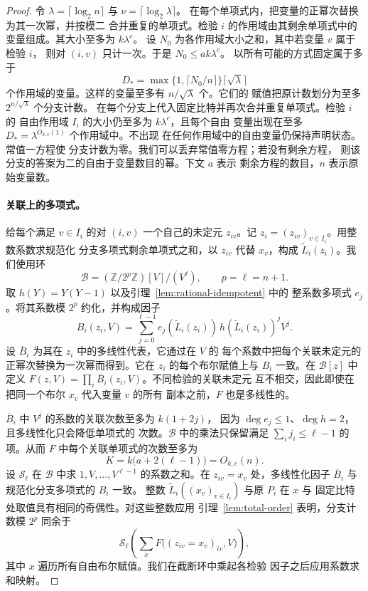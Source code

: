 \begin{proof}
令 $\lambda=\lceil\log_2 n\rceil$ 与
$\nu=\lceil\log_2\lambda\rceil$。
在每个单项式内，把变量的正幂次替换为其一次幂，并按模二
合并重复的单项式。检验 $i$ 的作用域由其剩余单项式中的
变量组成。其大小至多为 $k\lambda^c$。
设 $N_0$ 为各作用域大小之和，其中若变量 $v$ 属于检验 $i$，
则对 $(i,v)$ 只计一次。于是 $N_0\le ak\lambda^c$。
以所有可能的方式固定属于多于
\[
 D_*=\max\{1,\lceil N_0/n\rceil\}\lceil\sqrt{\lambda}\rceil
\]
个作用域的变量。这样的变量至多有 $n/\sqrt{\lambda}$ 个。它们的
赋值把原计数划分为至多 $2^{n/\sqrt{\lambda}}$ 个分支计数。
在每个分支上代入固定比特并再次合并重复单项式。检验 $i$ 的
自由作用域 $I_i$ 的大小仍至多为 $k\lambda^c$，且每个自由
变量出现在至多 $D_*=\lambda^{O_{k,c}(1)}$ 个作用域中。不出现
在任何作用域中的自由变量仍保持声明状态。常值一方程使
分支计数为零。我们可以丢弃常值零方程；若没有剩余方程，
则该分支的答案为二的自由于变量数目的幂。下文 $a$ 表示
剩余方程的数目，$n$ 表示原始变量数。

\paragraph{关联上的多项式。}
给每个满足 $v\in I_i$ 的对 $(i,v)$ 一个自己的未定元
$z_{iv}$。记 $z_i=(z_{iv})_{v\in I_i}$。用整数系数求规范化
分支多项式剩余单项式之和，以 $z_{iv}$ 代替 $x_v$，构成
$\widetilde L_i(z_i)$。我们使用环
\[
 \mathcal B=(\mathbb Z/2^p\mathbb Z)[V]/(V^\ell),
 \qquad p=\ell=n+1 .
\]
取 $h(Y)=Y(Y-1)$ 以及引理~\ref{lem:rational-idempotent} 中的
整系数多项式 $e_j$。将其系数模 $2^p$ 约化，并构成因子
\[
 B_i(z_i,V)=\sum_{j=0}^{\ell-1}
   e_j(\widetilde L_i(z_i))\,h(\widetilde L_i(z_i))^j V^j .
\]
设 $\overline B_i$ 为其在 $z_i$ 中的多线性代表，它通过在 $V$ 的
每个系数中把每个关联未定元的正幂次替换为一次幂而得到。它在
$z_i$ 的每个布尔赋值上与 $B_i$ 一致。在 $\mathcal B[z]$ 中定义
$F(z,V)=\prod_i\overline B_i(z_i,V)$。不同检验的关联未定元
互不相交，因此即使在把同一个布尔 $x_v$ 代入变量 $v$ 的所有
副本之前，$F$ 也是多线性的。

$\overline B_i$ 中 $V^j$ 的系数的关联次数至多为 $k(1+2j)$，
因为 $\deg e_j\le1$、$\deg h=2$，且多线性化只会降低单项式的
次数。$\mathcal B$ 中的乘法只保留满足 $\sum_i j_i\le\ell-1$
的项。从而 $F$ 中每个关联单项式的次数至多为
\begin{equation}\label{eq:sharp-incidence-degree}
 K=k\bigl(a+2(\ell-1)\bigr)=O_{k,c}(n).
\end{equation}
设 $\mathcal S_\ell$ 在 $\mathcal B$ 中求 $1,V,\ldots,V^{\ell-1}$
的系数之和。在 $z_{iv}=x_v$ 处，多线性化因子
$\overline B_i$ 与规范化分支多项式的 $B_i$ 一致。
整数 $\widetilde L_i((x_v)_{v\in I_i})$ 与原 $P_i$ 在 $x$ 与
固定比特处取值具有相同的奇偶性。对这些整数应用
引理~\ref{lem:total-order} 表明，分支计数模 $2^p$ 同余于
\begin{equation}\label{eq:sharp-branch-residue}
 \mathcal S_\ell\left(\sum_x F\bigl((z_{iv}=x_v)_{iv},V\bigr)\right),
\end{equation}
其中 $x$ 遍历所有自由布尔赋值。我们在截断环中乘起各检验
因子之后应用系数求和映射。


\end{proof}
